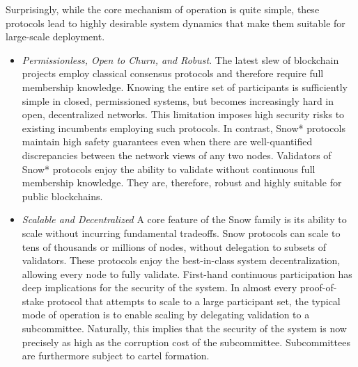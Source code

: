 \documentclass[runningheads]{llncs}
\begin{document}
Surprisingly, while the core mechanism of operation is quite simple, these protocols lead to highly desirable system dynamics that make them suitable for large-scale deployment.
\begin{itemize}
\item \textit{Permissionless, Open to Churn, and Robust}. The latest slew of blockchain projects employ classical consensus protocols and therefore require full membership knowledge. Knowing the entire set of participants is sufficiently simple in closed, permissioned systems, but becomes increasingly hard in open, decentralized networks. This limitation imposes high security risks to existing incumbents employing such protocols. In contrast, Snow* protocols maintain high safety guarantees even when there are well-quantified discrepancies between the network views of any two nodes. Validators of Snow* protocols enjoy the ability to validate without continuous full membership knowledge. They are, therefore, robust and highly suitable for public blockchains.
\item \textit{Scalable and Decentralized} A core feature of the Snow family is its ability to scale without incurring fundamental tradeoffs. Snow protocols can scale to tens of thousands or millions of nodes, without delegation to subsets of validators. These protocols enjoy the best-in-class system decentralization, allowing every node to fully validate. First-hand continuous participation has deep implications for the security of the system. In almost every proof-of-stake protocol that attempts to scale to a large participant set, the typical mode of operation is to enable scaling by delegating validation to a subcommittee. Naturally, this implies that the security of the system is now precisely as high as the corruption cost of the subcommittee. Subcommittees are furthermore subject to cartel formation. 


\end{itemize}
\end{document}
